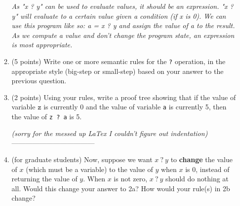 \documentclass[11pt]{article}
\begin{document}
\begin{enumerate}
\begin{enumerate}
\textit{
As "x ? y" can be used to evaluate values, it should be an expression.  "x ? y" will evaluate to a certain value given a condition (if x is 0).  We can use this program like so: a = x ? y and assign the value of a to the result.  As we compute a value and don't change the program state, an expression is most appropriate.}

\vspace{1in}

\item (5 points) Write one or more semantic rules for the \texttt{?} operation, in the appropriate style (big-step or small-step) based on your answer to the previous question. \newline

\begin{center}
\end{center}

\vspace{2.3in}

\item (2 points) Using your rules, write a proof tree showing that if the value of variable $\texttt{z}$ is currently 0 and the value of variable \texttt{a} is currently 5, then the value of \texttt{z ?\ a} is 5. \newline

\textit{(sorry for the messed up LaTex I couldn't figure out indentation)}\newline
   \texit{ }\newline
------------------------------------\newline





\vspace{1.8in}


\item (for graduate students) Now, suppose we want $x\ \texttt{?}\ y$ to \textbf{change} the value of $x$ (which must be a variable) to the value of $y$ when $x$ is 0, instead of returning the value of $y$. When $x$ is not zero, $x\ \texttt{?}\ y$ should do nothing at all. Would this change your answer to 2a? How would your rule(s) in 2b change? \newline


\end{enumerate}
\end{enumerate}
\end{document}
